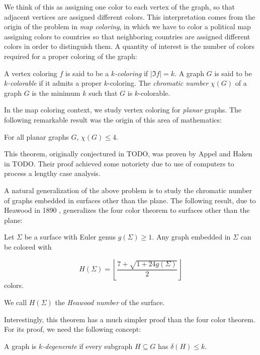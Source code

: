 We think of this as assigning one color to each vertex of the graph, so that adjacent vertices are assigned different colors. This interpretation comes from the origin of the problem in \textit{map coloring}, in which we have to color a political map assigning colors to countries so that neighboring countries are assigned different colors in order to distinguish them. A quantity of interest is the number of colors required for a proper coloring of the graph:

\begin{definition}
A vertex coloring $f$ is said to be a $k$\emph{-coloring} if $|\Im f| = k$. A graph $G$ is said to be $k$\emph{-colorable} if it admits a proper $k$-coloring. The \emph{chromatic number} $\chi(G)$ of a graph $G$ is the minimum $k$ such that $G$ is $k$-colorable. 
\end{definition}

In the map coloring context, we study vertex coloring for \emph{planar} graphs. The following remarkable result was the origin of this area of mathematics:

\begin{theorem}
For all planar graphs $G$, $\chi(G) \leq 4$.
\end{theorem}

This theorem, originally conjectured in TODO, was proven by Appel and Haken in TODO. Their proof achieved some notoriety due to use of computers to process a lengthy case analysis. 

A natural generalization of the above problem is to study the chromatic number of graphs embedded in surfaces other than the plane. The following result, due to Heawood in 1890 \cite{heawoodmapcolour}, generalizes the four color theorem to surfaces other than the plane:

\begin{theorem}[Heawood]
Let $\Sigma$ be a surface with Euler genus $g(\Sigma) \geq 1$. Any graph embedded in $\Sigma$ can be colored with

$$
H(\Sigma) = \left\lfloor \frac{7 + \sqrt{1+24g(\Sigma)}}{2} \right\rfloor
$$
colors.
\end{theorem}

We call $H(\Sigma)$ the \emph{Heawood number} of the surface.

Interestingly, this theorem has a much simpler proof than the four color theorem. For its proof, we need the following concept:


\begin{definition} A graph is $k$\emph{-degenerate} if every subgraph $H \subseteq G$ has $\delta(H) \leq k$.
\end{definition}

